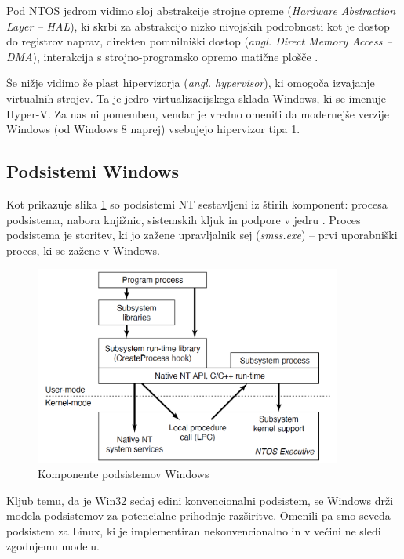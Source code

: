 \documentclass[a4paper,12pt,openright]{book}
\begin{document}
Pod NTOS jedrom vidimo sloj abstrakcije strojne opreme (\textit{Hardware Abstraction Layer -- HAL}), ki skrbi za abstrakcijo nizko nivojskih podrobnosti kot je dostop do registrov naprav, direkten pomnilniški dostop (\textit{angl. Direct Memory Access -- DMA}), interakcija s strojno-programsko opremo matične plošče \cite{Tanenbaum_Bos_2023}.

Še nižje vidimo še plast hipervizorja (\textit{angl. hypervisor}), ki omogoča izvajanje virtualnih strojev.
Ta je jedro virtualizacijskega sklada Windows, ki se imenuje Hyper-V.
Za nas ni pomemben, vendar je vredno omeniti da modernejše verzije Windows (od Windows 8 naprej) vsebujejo hipervizor tipa 1.

\subsection{Podsistemi Windows} \label{ssec:windows:subsystems}

Kot prikazuje slika \ref{fig:windows_subsystems_components} so podsistemi NT sestavljeni iz štirih komponent: procesa podsistema, nabora knjižnic, sistemskih kljuk in podpore v jedru \cite{Tanenbaum_Bos_2023}.
Proces podsistema je storitev, ki jo zažene upravljalnik sej (\textit{smss.exe}) -- prvi uporabniški proces, ki se zažene v Windows.

\begin{figure}[h!]
	\begin{center}
		\includegraphics[width=0.9\textwidth]{images/windows_subsystems_components.png}
	\end{center}
	\caption{Komponente podsistemov Windows \cite{Tanenbaum_Bos_2023}}
	\label{fig:windows_subsystems_components}
\end{figure}

Kljub temu, da je Win32 sedaj edini konvencionalni podsistem, se Windows drži modela podsistemov za potencialne prihodnje razširitve.
Omenili pa smo seveda podsistem za Linux, ki je implementiran nekonvencionalno in v večini ne sledi zgodnjemu modelu.
\end{document}
